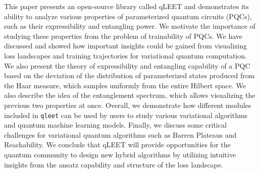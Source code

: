 This paper presents an open-source library called qLEET and demonstrates its ability to analyze various properties of parameterized quantum circuits (PQCs), such as their expressibility and entangling power. We motivate the importance of studying these properties from the problem of trainability of PQCs. We have discussed and showed how important insights could be gained from visualizing loss landscapes and training trajectories for variational quantum computation. We also present the theory of expressibility and entangling capability of a PQC based on the deviation of the distribution of parameterized states produced from the Haar measure, which samples uniformly from the entire Hilbert space. We also describe the idea of the entanglement spectrum, which allows visualizing the previous two properties at once. Overall, we demonstrate how different modules included in \texttt{qleet} can be used by users to study various variational algorithms and quantum machine learning models. Finally, we discuss some critical challenges for variational quantum algorithms such as Barren Plateaus and Reachability. We conclude that qLEET will provide opportunities for the quantum community to design new hybrid algorithms by utilizing intuitive insights from the ansatz capability and structure of the loss landscape.